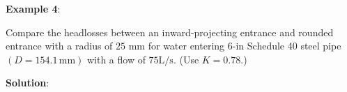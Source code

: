 \documentclass[10pt, one-sided]{amsart}
\begin{document}
\begin{multicols}{2}
\textbf{Example 4}:

Compare the headlosses between an inward-projecting entrance and rounded entrance with a radius of $25\text{ mm}$
for water entering $6\text{-in}$ Schedule 40 steel pipe $(D=154.1\,\text{mm})$ with a flow of $75\text{L/s}$. (Use $K=0.78$.)

\textbf{Solution}:

%


\vfill
\pagebreak
	
\end{multicols}
\end{document}
